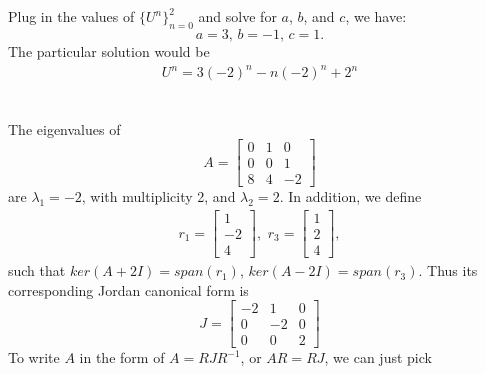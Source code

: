 \documentclass[11pt]{article}
\begin{document}
\subsection{}
Plug in the values of $\{U^n\}_{n=0}^2$ and solve for $a$, $b$, and $c$, we have:
\begin{equation}
    a=3,\,b=-1,\,c=1.
\nonumber\end{equation} 
The particular solution would be
\begin{equation}\begin{split}
    U^n = 3(-2)^n -n (-2)^n +2^n\\
\end{split}\end{equation} 
\subsection{}
The eigenvalues of
\begin{equation}
    A = \begin{bmatrix}
        0 & 1 & 0\\
        0 & 0 & 1\\
        8 & 4 & -2
    \end{bmatrix} 
\end{equation}
are $\lambda_1 = -2$, with multiplicity 2, and $\lambda_2 = 2$. In addition, we define
\begin{equation}\begin{split}
    r_1 = \begin{bmatrix}
        1 \\ -2 \\ 4
    \end{bmatrix},\,\,
    r_3 = \begin{bmatrix}
        1 \\ 2 \\ 4
    \end{bmatrix}, 
\nonumber\end{split}\end{equation}
such that $ker(A+2I)=span(r_1)$, $ker(A-2I)=span(r_3)$. 
Thus its corresponding Jordan canonical form is
\begin{equation}
    J=\begin{bmatrix}
        -2 & 1 & 0\\
        0 & -2 & 0\\
        0 & 0 & 2
    \end{bmatrix}
\end{equation} 
To write $A$ in the form of $A=RJR^{-1}$, or $AR=RJ$, we can just pick
\end{document}
